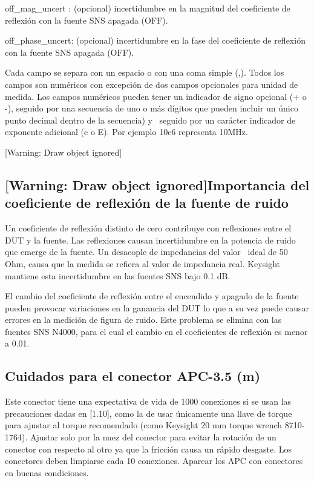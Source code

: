 \documentclass{article}
\begin{document}
off\_mag\_uncert : (opcional) incertidumbre en la magnitud del coeficiente de reflexión con la fuente SNS apagada (OFF).

off\_phase\_uncert: (opcional) incertidumbre en la fase del coeficiente de reflexión con la fuente SNS apagada (OFF).


\bigskip

Cada campo se separa con un espacio o con una coma simple (,). Todos los campos son numéricos con excepción de dos campos opcionales para unidad de medida. Los campos numéricos pueden tener un indicador de signo opcional (+ o -), seguido por una secuencia de uno o más dígitos que pueden incluir un único punto decimal dentro de la secuencia) y \ seguido por un carácter indicador de exponente adicional (e o E). Por ejemplo 10e6 representa 10MHz.


\bigskip


\bigskip

[Warning: Draw object ignored]

\clearpage\subsection[Importancia del coeficiente de reflexión de la fuente de ruido]{[Warning: Draw object ignored]Importancia del coeficiente de reflexión de la fuente de ruido}
Un coeficiente de reflexión distinto de cero contribuye con reflexiones entre el DUT y la fuente. Las reflexiones causan incertidumbre en la potencia de ruido que emerge de la fuente. Un desacople de impedancias del valor \ ideal de 50 Ohm, causa que la medida se refiera al valor de impedancia real. Keysight mantiene esta incertidumbre en las fuentes SNS bajo 0.1 dB.

El cambio del coeficiente de reflexión entre el encendido y apagado de la fuente pueden provocar variaciones en la ganancia del DUT lo que a su vez puede causar errores en la medición de figura de ruido. Este problema se elimina con las fuentes SNS N4000, para el cual el cambio en el coeficientes de reflexión es menor a 0.01.

\subsection{Cuidados para el conector APC-3.5 (m)}
Este conector tiene una expectativa de vida de 1000 conexiones si se usan las precauciones dadas en [1.10], como la de usar únicamente una llave de torque para ajustar al torque recomendado (como Keysight 20 mm torque wrench 8710-1764). Ajustar solo por la nuez del conector para evitar la rotación de un conector con respecto al otro ya que la fricción causa un rápido desgaste. Los conectores deben limpiarse cada 10 conexiones. Aparear los APC con conectores en buenas condiciones.
\end{document}
